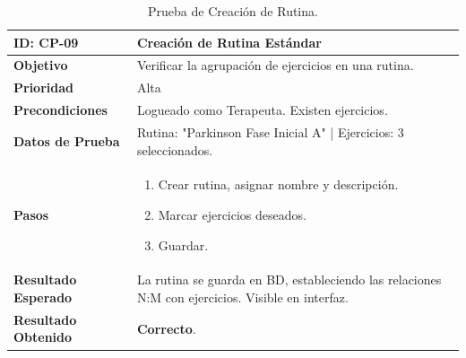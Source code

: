 \begin{table}[H]
    \centering
    \begin{tabularx}{\textwidth}{|l|X|}
        \hline
        \rowcolor{gray!25} \textbf{ID: CP-09} & \textbf{Creación de Rutina Estándar} \\ \hline
        \textbf{Objetivo} & Verificar la agrupación de ejercicios en una rutina. \\ \hline
        \textbf{Prioridad} & Alta \\ \hline
        \textbf{Precondiciones} & Logueado como Terapeuta. Existen ejercicios. \\ \hline
        \textbf{Datos de Prueba} & Rutina: "Parkinson Fase Inicial A" | Ejercicios: 3 seleccionados. \\ \hline
        \textbf{Pasos} & 
        \vspace*{-\baselineskip}
        \begin{enumerate}
            \item Crear rutina, asignar nombre y descripción.
            \item Marcar ejercicios deseados.
            \item Guardar.
        \end{enumerate} \\ \hline
        \textbf{Resultado Esperado} & La rutina se guarda en BD, estableciendo las relaciones N:M con ejercicios. Visible en interfaz. \\ \hline
        \textbf{Resultado Obtenido} & \textcolor{green!40!black}{\textbf{Correcto}}. \\ \hline
    \end{tabularx}
    \caption{Prueba de Creación de Rutina.}
\end{table}